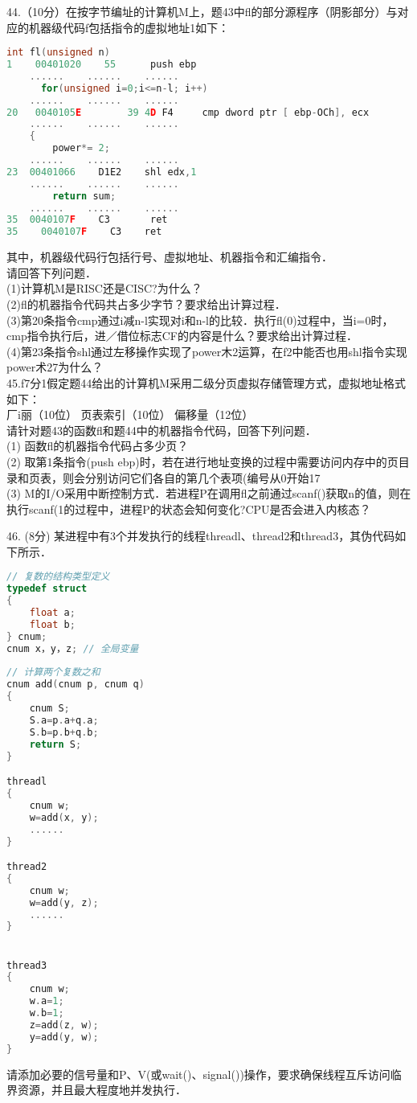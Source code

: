 44.（10分）在按字节编址的计算机M上，题43中fl的部分源程序（阴影部分）与对应的机器级代码f包括指令的虚拟地址1如下：
\begin{lstlisting}[language=cpp]
      int fl(unsigned n)
1    00401020    55      push ebp
    ......    ......    ......
      for(unsigned i=0;i<=n-l; i++)
    ......    ......    ......
20   0040105E        39 4D F4     cmp dword ptr [ ebp-OCh], ecx
    ......    ......    ......
    {
        power*= 2;
    ......    ......    ......
23  00401066    D1E2    shl edx,1
    ......    ......    ......
        return sum;
    ......    ......    ......
35  0040107F    C3       ret
35    0040107F    C3    ret
\end{lstlisting}
其中，机器级代码行包括行号、虚拟地址、机器指令和汇编指令． \\
请回答下列问题． \\
(1)计算机M是RISC还是CISC?为什么？ \\
(2)fl的机器指令代码共占多少字节？要求给出计算过程． \\
(3)第20条指令cmp通过i减n-l实现对i和n-l的比较．执行fl(0)过程中，当i=0时，cmp指令执行后，进／借位标志CF的内容是什么？要求给出计算过程． \\
(4)第23条指令shl通过左移操作实现了power木2运算，在f2中能否也用shl指令实现power术27为什么？ \\

45.f7分1假定题44给出的计算机M采用二级分页虚拟存储管理方式，虚拟地址格式如下： \\
厂i丽（10位）    页表索引（10位）    偏移量（12位） \\
请针对题43的函数fl和题44中的机器指令代码，回答下列问题． \\
(1) 函数fl的机器指令代码占多少页？ \\
(2) 取第1条指令(push ebp)时，若在进行地址变换的过程中需要访问内存中的页目录和页表，则会分别访问它们各自的第几个表项(编号从0开始17 \\
(3) M的I/O采用中断控制方式．若进程P在调用fl之前通过scanf()获取n的值，则在执行scanf(1的过程中，进程P的状态会知何变化?CPU是否会进入内核态？

46. (8分) 某进程中有3个并发执行的线程threadl、thread2和thread3，其伪代码如下所示． \\
\begin{lstlisting}[language=cpp]
// 复数的结构类型定义
typedef struct       
{
    float a;
    float b;
} cnum;         
cnum x，y，z; // 全局变量
                          
// 计算两个复数之和     
cnum add(cnum p, cnum q)
{                         
    cnum S;  
    S.a=p.a+q.a;
    S.b=p.b+q.b;      
    return S;
}

threadl
{             
    cnum w;
    w=add(x, y);
    ......
}

thread2
{
    cnum w;
    w=add(y, z);
    ......
}


thread3
{
    cnum w;
    w.a=1;
    w.b=1;
    z=add(z, w);
    y=add(y, w);
}
\end{lstlisting}
请添加必要的信号量和P、V(或wait()、signal())操作，要求确保线程互斥访问临界资源，并且最大程度地并发执行．

